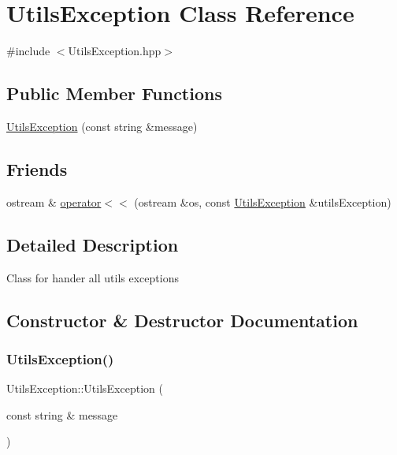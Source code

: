 \hypertarget{class_utils_exception}{}\section{Utils\+Exception Class Reference}
\label{class_utils_exception}


{\ttfamily \#include $<$Utils\+Exception.\+hpp$>$}

\subsection*{Public Member Functions}
\begin{DoxyCompactItemize}
\item 
\hyperlink{class_utils_exception_ab8cad43c55b3ce4a62e32b85c1c46491}{Utils\+Exception} (const string \&message)
\end{DoxyCompactItemize}
\subsection*{Friends}
\begin{DoxyCompactItemize}
\item 
ostream \& \hyperlink{class_utils_exception_a6ebd1d5ff627152beaa743b43fc2f9d3}{operator$<$$<$} (ostream \&os, const \hyperlink{class_utils_exception}{Utils\+Exception} \&utils\+Exception)
\end{DoxyCompactItemize}


\subsection{Detailed Description}
Class for hander all utils exceptions 

\subsection{Constructor \& Destructor Documentation}
\hypertarget{class_utils_exception_ab8cad43c55b3ce4a62e32b85c1c46491}{}\label{class_utils_exception_ab8cad43c55b3ce4a62e32b85c1c46491} 
\subsubsection{\texorpdfstring{Utils\+Exception()}{UtilsException()}}
{\footnotesize\ttfamily Utils\+Exception\+::\+Utils\+Exception (\begin{DoxyParamCaption}\item[{const string \&}]{message }\end{DoxyParamCaption})}

